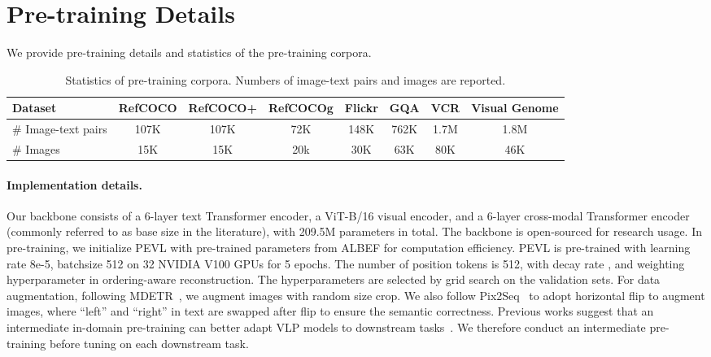 \documentclass[11pt]{article}
\begin{document}
\section{Pre-training Details}
\label{sec:appendix}
We provide pre-training details and statistics of the pre-training corpora.


\begin{table*}[!t]
    \centering
    \small
    \setlength{\tabcolsep}{4pt}
\begin{tabular}[t]{l ccccccc}
    \toprule
     Dataset & RefCOCO & RefCOCO+ & RefCOCOg & Flickr & GQA & VCR & Visual Genome \\
    \midrule
     \# Image-text pairs & 107K & 107K & 72K & 148K & 762K & 1.7M & 1.8M \\
     \# Images & 15K & 15K & 20k & 30K & 63K & 80K & 46K \\
    \bottomrule
    \end{tabular}
    \caption{Statistics of pre-training corpora. Numbers of image-text pairs and images are reported.}
    \label{Table:data_statistics}
\end{table*}



\paragraph{Implementation details.} Our backbone consists of a 6-layer text Transformer encoder, a ViT-B/16 visual encoder, and a 6-layer cross-modal Transformer encoder (commonly referred to as base size in the literature), with 209.5M parameters in total. The backbone is open-sourced for research usage. In pre-training, we initialize PEVL with pre-trained parameters from ALBEF for computation efficiency. PEVL is pre-trained with learning rate 8e-5, batchsize 512 on 32 NVIDIA V100 GPUs for 5 epochs. The number of position tokens is 512, with decay rate , and weighting hyperparameter  in ordering-aware reconstruction. The hyperparameters are selected by grid search on the validation sets. For data augmentation, following MDETR~\cite{kamath2021mdetr}, we augment images with random size crop. We also follow Pix2Seq~\cite{chen2021pix2seq} to adopt horizontal flip to augment images, where ``left'' and ``right'' in text are swapped after flip to ensure the semantic correctness. Previous works suggest that an intermediate in-domain pre-training can better adapt VLP models to downstream tasks~\cite{chen2020uniter}. We therefore conduct an intermediate pre-training before tuning on each downstream task.
\end{document}
